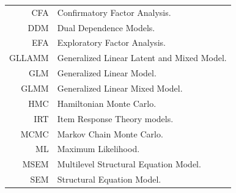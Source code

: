 \documentclass[12pt,a4paper,oneside]{book}
\begin{document}
\begin{tabular}{rl}
	CFA		& Confirmatory Factor Analysis. \\
	DDM		& Dual Dependence Models.\\
	EFA		& Exploratory Factor Analysis. \\
	GLLAMM	& Generalized Linear Latent and Mixed Model. \\
	GLM		& Generalized Linear Model. \\
	GLMM	& Generalized Linear Mixed Model. \\
	HMC		& Hamiltonian Monte Carlo.\\
	IRT		& Item Response Theory models. \\
	MCMC	& Markov Chain Monte Carlo.\\
	ML		& Maximum Likelihood.\\
	MSEM	& Multilevel Structural Equation Model.\\
	SEM		& Structural Equation Model. \\
	
\end{tabular}
%
%
%
%
%
%
\newpage
\setcounter{page}{1}
%






\appendix


%
%
\newpage
\backmatter \singlespacing			%

%
%
\end{document}
